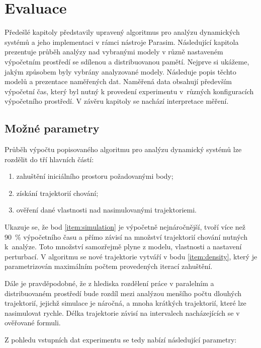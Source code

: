 \chapter{Evaluace}\label{chapter:evaluation}

Předešlé kapitoly představily upravený algoritmus pro analýzu dy\-na\-mic\-kých systémů
a jeho implementaci v rámci nástroje Parasim. Následující kapitola prezentuje průběh 
analýzy nad vybranými modely v různě nastaveném výpočetním prostředí se sdílenou a distribuovanou pamětí.
Nejprve si ukážeme, jakým způsobem byly vybrány analyzované modely. Následuje popis těchto modelů
a prezentace naměřených dat. Na\-mě\-ře\-ná data obsahují především
výpočetní čas, který byl nutný k provedení experimentu v~růz\-ných konfiguracích výpočetního
prostředí. V závěru kapitoly se na\-chá\-zí interpretace mě\-ře\-ní.

\section{Možné parametry}

Průběh výpočtu popisovaného algoritmu pro analýzu dynamický systémů lze rozdělit do tří hlavních částí:

\begin{enumerate}
	\item	zahuštění iniciálního prostoru požadovanými body; \label{item:density}
	\item	získání trajektorií chování;\label{item:simulation}
	\item	ověření dané vlastnosti nad nasimulovanými trajektoriemi. 
\end{enumerate}

Ukazuje se, že bod \ref{item:simulation} je výpočetně nejnáročnější, tvoří více než 90~\% výpočetního času a přímo závisí na 
množství  trajektorií chování nutných k~analýze. Toto množství samozřejmě plyne z modelu, vlastnosti a nastavení perturbací.
V algoritmu se nové trajektorie vytváří v bodu \ref{item:density}, který je parametrizován maximálním
počtem provedených iterací zahuštění.

Dále je pravděpodobné, že z hlediska roz\-dě\-le\-ní práce v paralelním a distribuovaném
prostředí bude rozdíl mezi analýzou menšího počtu dlouhých trajektorií, jejichž simulace
je náročná, a mnoha krátkých trajektorií, které lze nasimulovat rychle. Délka trajektorie
závisí na intervalech nacházejících se v ověřované formuli. 

Z pohledu vstupních dat experimentu se tedy nabízí následující parametry:


